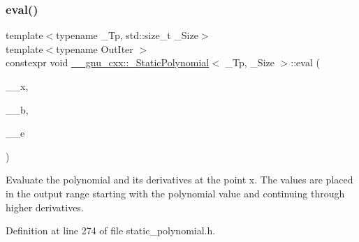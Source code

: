\subsubsection{\texorpdfstring{eval()}{eval()}\hspace{0.1cm}{\footnotesize\ttfamily [2/2]}}
{\footnotesize\ttfamily template$<$typename \+\_\+\+Tp, std\+::size\+\_\+t \+\_\+\+Size$>$ \\
template$<$typename Out\+Iter $>$ \\
constexpr void \hyperlink{class____gnu__cxx_1_1__StaticPolynomial}{\+\_\+\+\_\+gnu\+\_\+cxx\+::\+\_\+\+Static\+Polynomial}$<$ \+\_\+\+Tp, \+\_\+\+Size $>$\+::eval (\begin{DoxyParamCaption}\item[{\hyperlink{class____gnu__cxx_1_1__StaticPolynomial_aad5f3d6d5876b6926b30724aeac649d6}{value\+\_\+type}}]{\+\_\+\+\_\+x,  }\item[{Out\+Iter}]{\+\_\+\+\_\+b,  }\item[{Out\+Iter}]{\+\_\+\+\_\+e }\end{DoxyParamCaption})\hspace{0.3cm}{\ttfamily [inline]}}

Evaluate the polynomial and its derivatives at the point x. The values are placed in the output range starting with the polynomial value and continuing through higher derivatives. 

Definition at line 274 of file static\+\_\+polynomial.\+h.


